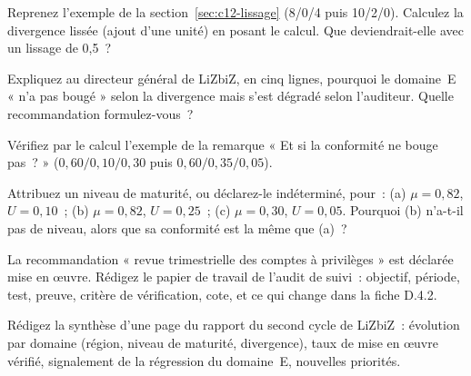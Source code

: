 \begin{boxexo}[title={\ding{45}\quad Exercice~12.5. Le zéro \niveaumoyen}]
Reprenez l'exemple de la section~\ref{sec:c12-lissage} (8/0/4 puis
10/2/0). Calculez la divergence lissée (ajout d'une unité) en posant le
calcul. Que deviendrait-elle avec un lissage de 0,5~?
\end{boxexo}

\begin{boxexo}[title={\ding{45}\quad Exercice~12.6. La régression \niveaumoyen}]
Expliquez au directeur général de LiZbiZ, en cinq lignes, pourquoi le
domaine~E « n'a pas bougé » selon la divergence mais s'est dégradé selon
l'auditeur. Quelle recommandation formulez-vous~?
\end{boxexo}

\begin{boxexo}[title={\ding{45}\quad Exercice~12.7. Constance sans progrès~? \niveaumoyen}]
Vérifiez par le calcul l'exemple de la remarque « Et si la conformité ne
bouge pas~? » ($0{,}60/0{,}10/0{,}30$ puis $0{,}60/0{,}35/0{,}05$).
\end{boxexo}

\begin{boxexo}[title={\ding{45}\quad Exercice~12.8. La maturité \niveaubase}]
Attribuez un niveau de maturité, ou déclarez-le indéterminé, pour~: (a)
$\mu = 0{,}82$, $U = 0{,}10$~; (b) $\mu = 0{,}82$, $U = 0{,}25$~; (c)
$\mu = 0{,}30$, $U = 0{,}05$. Pourquoi (b) n'a-t-il pas de niveau, alors que
sa conformité est la même que (a)~?
\end{boxexo}

\begin{boxexo}[title={\ding{45}\quad Exercice~12.9. L'audit de suivi \niveauexpert}]
La recommandation « revue trimestrielle des comptes à privilèges » est
déclarée mise en œuvre. Rédigez le papier de travail de l'audit de suivi~:
objectif, période, test, preuve, critère de vérification, cote, et ce qui
change dans la fiche D.4.2.
\end{boxexo}

\begin{boxexo}[title={\ding{45}\quad Exercice~12.10. Le rapport du second cycle \niveauexpert}]
Rédigez la synthèse d'une page du rapport du second cycle de LiZbiZ~:
évolution par domaine (région, niveau de maturité, divergence), taux de
mise en œuvre vérifié, signalement de la régression du domaine~E, nouvelles
priorités.
\end{boxexo}

\bigskip

